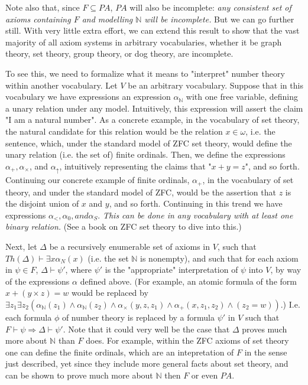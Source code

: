 \documentclass{article}
\theoremstyle{definition}
\theoremstyle{plain}
\theoremstyle{theorem}
\begin{document}
\par Note also that, since $F \subseteq PA$, $PA$ will also be incomplete: \textit{any consistent set of axioms containing $F$ and modelling $\mathbb{N}$ will be incomplete.} But we can go further still. With very little extra effort, we can extend this result to show that the vast majority of all axiom systems in arbitrary vocabularies, whether it be graph theory, set theory, group theory, or dog theory, are incomplete.
\par To see this, we need to formalize what it means to "interpret" number theory within another vocabulary. Let $V$ be an arbitrary vocabulary. Suppose that in this vocabulary we have expressions an expression $\alpha_{\mathbb{N}}$ with one free variable, defining a unary relation under any model. Intuitively, this expression will assert the claim "I am a natural number". As a concrete example, in the vocabulary of set theory, the natural candidate for this relation would be the relation $x \in \omega$, i.e. the sentence, which, under the standard model of ZFC set theory, would define the unary relation (i.e. the set of) finite ordinals. Then, we define the expressions $\alpha_+,\alpha_{\times}$, and $\alpha_{\uparrow}$, intuitively representing the claims that "$x+y = z$", and so forth. Continuing our concrete example of finite ordinals, $\alpha_+$, in the vocabulary of set theory, and under the standard model of ZFC, would be the assertion that $z$ is the disjoint union of $x$ and $y$, and so forth. Continuing in this trend we have expressions $\alpha_<, \alpha_0, and \alpha_S$. \textit{This can be done in any vocabulary with at least one binary relation.} (See a book on ZFC set theory to dive into this.)
\par Next, let $\Delta$ be a recursively enumerable set of axioms in $V$, such that $Th(\Delta) \vdash \exists x \alpha_{N}(x)$ (i.e. the set $\mathbb{N}$ is nonempty), and such that for each axiom in $\psi \in F$, $\Delta \vdash \psi'$, where $\psi'$ is the "appropriate" interpretation of $\psi$ into $V$, by way of the expressions $\alpha$ defined above. (For example, an atomic formula of the form $x+(y \times z) = w$ would be replaced by $\exists z_1 \exists z_2 (\alpha_{\mathbb{N}}(z_1) \wedge \alpha_{\mathbb{N}}(z_2) \wedge \alpha_{\times}(y,z,z_1) \wedge \alpha_+(x,z_1,z_2) \wedge (z_2 = w))$.) I.e. each formula $\phi$ of number theory is replaced by a formula $\psi'$ in $V$ such that $F \vdash \psi \Rightarrow \Delta \vdash \psi'$. Note that it could very well be the case that $\Delta$ proves much more about $\mathbb{N}$ than $F$ does. For example, within the ZFC axioms of set theory one can define the finite ordinals, which are an intepretation of $F$ in the sense just described, yet since they include more general facts about set theory, and can be shown to prove much more about $\mathbb{N}$ then $F$ or even $PA$.
\end{document}
